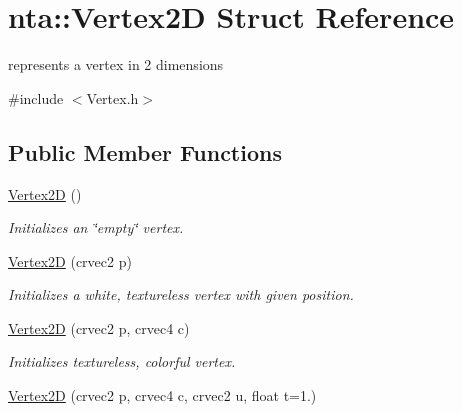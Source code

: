 \hypertarget{structnta_1_1Vertex2D}{}\section{nta\+:\+:Vertex2D Struct Reference}
\label{structnta_1_1Vertex2D}


represents a vertex in 2 dimensions  




{\ttfamily \#include $<$Vertex.\+h$>$}

\subsection*{Public Member Functions}
\begin{DoxyCompactItemize}
\item 
\mbox{\label{structnta_1_1Vertex2D_a696744d55f56ae170684266eab073c0f}} 
\hyperlink{structnta_1_1Vertex2D_a696744d55f56ae170684266eab073c0f}{Vertex2D} ()
\begin{DoxyCompactList}\small\item\em Initializes an \char`\"{}empty\char`\"{} vertex. \end{DoxyCompactList}\item 
\mbox{\label{structnta_1_1Vertex2D_ab0988223c10ad83057c4ade8891b4814}} 
\hyperlink{structnta_1_1Vertex2D_ab0988223c10ad83057c4ade8891b4814}{Vertex2D} (crvec2 p)
\begin{DoxyCompactList}\small\item\em Initializes a white, textureless vertex with given position. \end{DoxyCompactList}\item 
\mbox{\label{structnta_1_1Vertex2D_aa2e8619f157a72c64d2438f49ec65554}} 
\hyperlink{structnta_1_1Vertex2D_aa2e8619f157a72c64d2438f49ec65554}{Vertex2D} (crvec2 p, crvec4 c)
\begin{DoxyCompactList}\small\item\em Initializes textureless, colorful vertex. \end{DoxyCompactList}\item 
\mbox{\label{structnta_1_1Vertex2D_a1c2fe391aeb3ca6d0b8eebfbce1b5862}} 
\hyperlink{structnta_1_1Vertex2D_a1c2fe391aeb3ca6d0b8eebfbce1b5862}{Vertex2D} (crvec2 p, crvec4 c, crvec2 u, float t=1.)

\end{DoxyCompactItemize}

